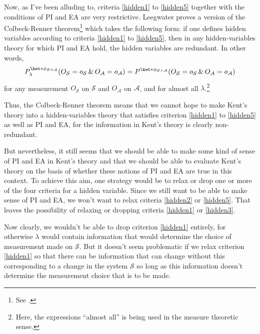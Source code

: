 \documentclass[12pt]{report}
\begin{document}
Now, as I've been alluding to, criteria \ref{hidden1} to \ref{hidden5} together with the conditions of PI and EA are very restrictive. Leegwater proves a version of the Colbeck-Renner theorem\footnote{See \cite{LeegwaterGijs2016Aitf}.} which takes the following form: if one defines hidden variables according to criteria \ref{hidden1} to \ref{hidden5}, then in any hidden-variables theory for which PI and EA hold, the hidden variables are redundant. In other words, 
\begin{equation}\label{colbeckrenner}
P_\lambda^{\ket*{\phi}_{\mathcal{S}+\mathcal{A}}}(O_\mathcal{S}=o_\mathcal{S}\, \& \,O_\mathcal{A}=o_\mathcal{A})=P^{\ket*{\phi}_{\mathcal{S}+\mathcal{A}}}(O_\mathcal{S}=o_\mathcal{S}\, \& \,O_\mathcal{A}=o_\mathcal{A})
\end{equation}
for any measurement $O_\mathcal{S}$ on $\mathcal{S}$ and $O_\mathcal{A}$ on $\mathcal{A}$, and for almost all $\lambda$.\footnote{Here, the expressions ``almost all'' is being used in the measure theoretic sense.} 

Thus, the Colbeck-Renner theorem means that we cannot hope to make Kent's theory into a hidden-variables theory that satisfies criterion \ref{hidden1} to \ref{hidden5} as well as  PI and EA, for the information in Kent's theory is clearly non-redundant.

But nevertheless, it still seems that we should be able to make some kind of sense of PI and EA in Kent's theory and that we should be able to evaluate Kent's theory on the basis of whether these notions of PI and EA are true in this context. To achieve this aim, one strategy would be to relax or drop one or more of the 
four criteria for a hidden variable. Since we still want to be able to make sense of PI and EA, we won't want to relax criteria \ref{hidden2} or \ref{hidden5}. That leaves the possibility of relaxing or dropping criteria \ref{hidden1} or \ref{hidden3}. 

Now clearly, we wouldn't be able to drop criterion \ref{hidden1} entirely, for otherwise $\lambda$ would contain information that would determine the choice of measurement made on $\mathcal{S}$. But it doesn't seem problematic if we relax criterion \ref{hidden1} so that there can be information that can change without this corresponding to a change in the system $\mathcal{S}$ so long as this information doesn't determine the measurement choice that is to be made. 
\end{document}
